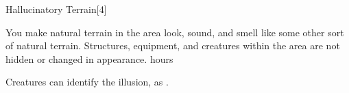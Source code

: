 \begin{spellsection}{Hallucinatory Terrain}[4]
    \begin{spellheader}
    \end{spellheader}
    \begin{spellcontent}
        \begin{spelltargetinginfo}
        \end{spelltargetinginfo}
        \begin{spelleffects}

            \spelleffect You make natural terrain in the area look, sound, and smell like some other sort of natural terrain. Structures, equipment, and creatures within the area are not hidden or changed in appearance.
             hours \dismissable
        \end{spelleffects}
    \end{spellcontent}
    \begin{spellfooter}
        \spellnotes Creatures can identify the illusion, as .
    \end{spellfooter}
\end{spellsection}

